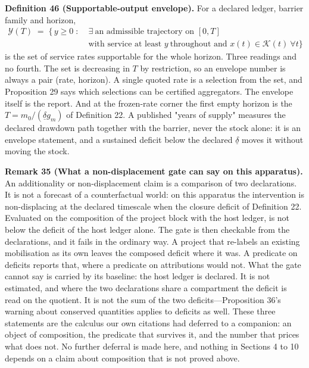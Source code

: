 \documentclass[11pt]{article}
\begin{document}
\textbf{Definition 46 (Supportable-output envelope).} For a declared ledger, barrier family and horizon, \[ \begin{aligned} \mathcal Y(T) \;=\; \bigl\{\, y \ge 0 \;:\;& \exists\ \text{an admissible trajectory on } [0,T] \ \\
  & \text{with service at least } y \ \text{throughout and } x(t) \in \mathcal K(t) \ \forall t \bigr\} \end{aligned} \] is the set of service rates supportable for the whole horizon. Three readings and no fourth. The set is decreasing in \(T\) by restriction, so an envelope number is always a pair (rate, horizon). A single quoted rate is a selection from the set, and Proposition 29 says which selections can be certified aggregators. The envelope itself is the report. And at the frozen-rate corner the first empty horizon is the \(T = m_0/(\underline\delta g_m)\) of Definition 22. A published "years of supply" measures the declared drawdown path together with the barrier, never the stock alone: it is an envelope statement, and a sustained deficit below the declared \(\underline\delta\) moves it without moving the stock.

\textbf{Remark 35 (What a non-displacement gate can say on this apparatus).} An additionality or non-displacement claim is a comparison of two declarations. It is not a forecast of a counterfactual world: on this apparatus the intervention is non-displacing at the declared timescale when the closure deficit of Definition 22. Evaluated on the composition of the project block with the host ledger, is not below the deficit of the host ledger alone. The gate is then checkable from the declarations, and it fails in the ordinary way. A project that re-labels an existing mobilisation as its own leaves the composed deficit where it was. A predicate on deficits reports that, where a predicate on attributions would not. What the gate cannot say is carried by its baseline: the host ledger is declared. It is not estimated, and where the two declarations share a compartment the deficit is read on the quotient. It is not the sum of the two deficits---Proposition 36's warning about conserved quantities applies to deficits as well. These three statements are the calculus our own citations had deferred to a companion: an object of composition, the predicate that survives it, and the number that prices what does not. No further deferral is made here, and nothing in Sections 4 to 10 depends on a claim about composition that is not proved above.
\end{document}
